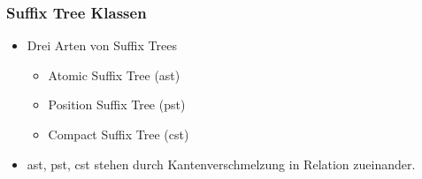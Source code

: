 \documentclass{beamer}
\begin{document}
\begin{frame}
    \frametitle{Suffix Tree Klassen}
    \begin{itemize}
        \item Drei Arten von Suffix Trees
        \begin{itemize}
            \item Atomic Suffix Tree (ast)
            \item Position Suffix Tree (pst)
            \item Compact Suffix Tree (cst)
        \end{itemize}
        \item ast, pst, cst stehen durch Kantenverschmelzung in Relation zueinander. 
    \end{itemize}
\end{frame}
\end{document}
